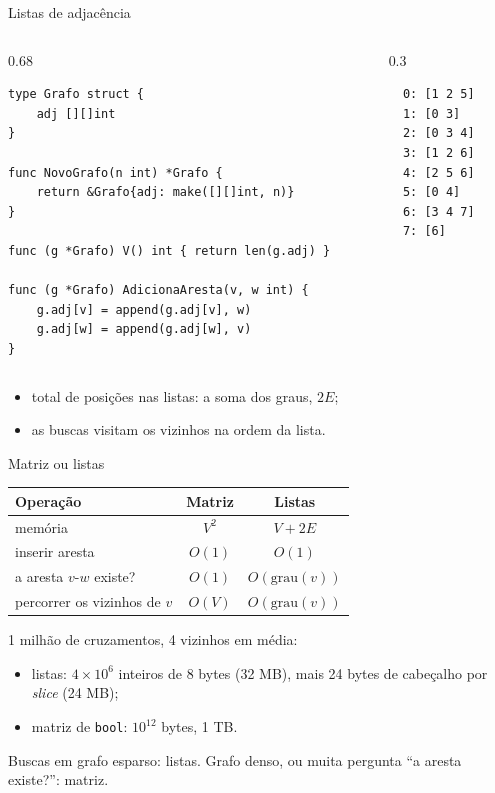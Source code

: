 \documentclass{beamer}
\begin{document}
\begin{frame}[fragile]{Listas de adjacência}
	\begin{columns}[T]
		\begin{column}{0.68\textwidth}
			\begin{verbatim}
type Grafo struct {
	adj [][]int
}

func NovoGrafo(n int) *Grafo {
	return &Grafo{adj: make([][]int, n)}
}

func (g *Grafo) V() int { return len(g.adj) }

func (g *Grafo) AdicionaAresta(v, w int) {
	g.adj[v] = append(g.adj[v], w)
	g.adj[w] = append(g.adj[w], v)
}
\end{verbatim}
		\end{column}
		\begin{column}{0.3\textwidth}
			\begin{verbatim}
  0: [1 2 5]
  1: [0 3]
  2: [0 3 4]
  3: [1 2 6]
  4: [2 5 6]
  5: [0 4]
  6: [3 4 7]
  7: [6]
\end{verbatim}
		\end{column}
	\end{columns}

	\begin{itemize}
		\item total de posições nas listas: a soma dos graus, $2E$;
		\item as buscas visitam os vizinhos na ordem da lista.
	\end{itemize}
\end{frame}

\begin{frame}{Matriz ou listas}
	\begin{center}
		\begin{tabular}{lcc}
			\toprule
			Operação & Matriz & Listas \\
			\midrule
			memória & $V^2$ & $V + 2E$ \\
			inserir aresta & $O(1)$ & $O(1)$ \\
			a aresta $v$-$w$ existe? & $O(1)$ & $O(\text{grau}(v))$ \\
			percorrer os vizinhos de $v$ & $O(V)$ & $O(\text{grau}(v))$ \\
			\bottomrule
		\end{tabular}
	\end{center}

	\vspace{0.2cm}
	1 milhão de cruzamentos, 4 vizinhos em média:
	\begin{itemize}
		\item listas: $4 \times 10^6$ inteiros de 8 bytes (32 MB), mais 24 bytes
		      de cabeçalho por \textit{slice} (24 MB);
		\item matriz de \texttt{bool}: $10^{12}$ bytes, 1 TB.
	\end{itemize}

	\vspace{0.2cm}
	Buscas em grafo esparso: listas. Grafo denso, ou muita pergunta ``a aresta
	existe?'': matriz.
\end{frame}
\end{document}
